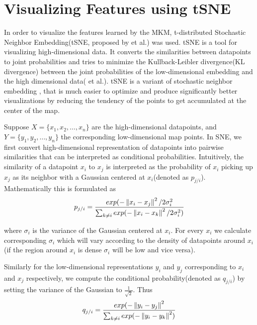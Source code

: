 \section{Visualizing Features using tSNE}
\label{chap2_tsne}
In order to visualize the features learned by the MKM, t-distributed Stochastic Neighbor Embedding(tSNE, proposed by \cite{tsne} et al.) was used. tSNE is a tool for visualizing high-dimensional data. It converts the similarities between datapoints to joint probabilities and tries to minimize the Kullback-Leibler divergence(KL divergence) between the joint probabilities of the low-dimensional embedding and the high dimensional data(\cite{tsne} et al.). tSNE is a variant of stochastic neighbor embedding , that is much easier to optimize and produce significantly better visualizations by reducing the tendency of the  points to get accumulated  at the center of the map.

Suppose $X = \{x_1, x_2, \ldots, x_n\}$ are the high-dimensional datapoints, and $Y = \{y_1, y_2, \ldots, y_n\}$ the corresponding low-dimensional map points. In SNE, we first convert high-dimensional representation of datapoints into pairwise similarities that can be interpreted as conditional probabilities. Intuitively, the similarity of a datapoint $x_i$ to $x_j$ is interpreted as the probability of $x_i$ picking up $x_j$ as its neighbor with a Gaussian centered at $x_i$(denoted as $p_{j/i}$). Mathematically this is formulated as
\[ p_{j/i} = \frac{exp(-\left\lVert x_i-x_j\right\rVert^2/2 \sigma_i^2}{\sum_{k\neq i} exp(-\left\lVert x_i - x_k\right\rVert^2/2 \sigma_i^2)}  \]

where $\sigma_i$ is the variance of the Gaussian centered at $x_i$. For every $x_i$ we calculate corresponding $\sigma_i$ which will vary according to the density of datapoints around $x_i$(if the region around $x_i$ is dense $\sigma_i$ will be low and vice versa).

Similarly for the low-dimensional representations $y_i$ and $y_j$ corresponding to $x_i$ and $x_j$ respectively, we compute the conditional probability(denoted as $q_{j/i}$) by setting the variance of the Gaussian to $\frac{1}{\sqrt{2}}$. Thus
\[ q_{j/i} = \frac{exp(-\left\lVert y_i-y_j\right\rVert^2}{\sum_{k\neq i} exp(-\left\lVert y_i - y_k\right\rVert^2)}  \]

